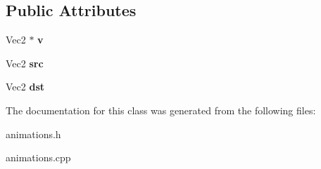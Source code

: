 \subsection*{Public Attributes}
\begin{DoxyCompactItemize}
\item 
\hypertarget{classg2c_1_1_move_vec2_adffd57ff283ab8f3384cde36eab6b88e}{
Vec2 $\ast$ {\bfseries v}}
\label{classg2c_1_1_move_vec2_adffd57ff283ab8f3384cde36eab6b88e}

\item 
\hypertarget{classg2c_1_1_move_vec2_a9a44968808e5bdf7ba6d62c0f769d8b9}{
Vec2 {\bfseries src}}
\label{classg2c_1_1_move_vec2_a9a44968808e5bdf7ba6d62c0f769d8b9}

\item 
\hypertarget{classg2c_1_1_move_vec2_a36bef88ed8c24fde755fb29e107ddff7}{
Vec2 {\bfseries dst}}
\label{classg2c_1_1_move_vec2_a36bef88ed8c24fde755fb29e107ddff7}

\end{DoxyCompactItemize}


The documentation for this class was generated from the following files:\begin{DoxyCompactItemize}
\item 
animations.h\item 
animations.cpp\end{DoxyCompactItemize}
